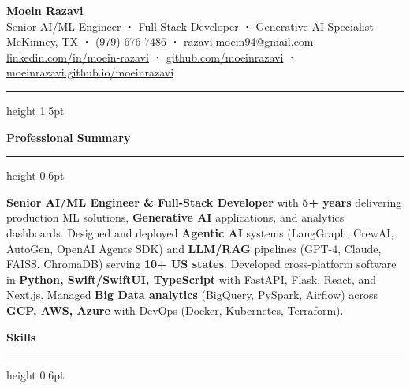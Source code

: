 \documentclass[11pt,letterpaper]{article}
\newcommand{\cvsection}[1]{%
  \vspace{0.2em}%
  {\color{headerblue}\large\bfseries #1}%
  \vspace{0.08em}%
  {\color{goldaccent}\hrule height 0.6pt}%
  \vspace{0.2em}%
}
\begin{document}
\begin{center}
  {\fontsize{20}{24}\selectfont\bfseries\color{headerblue}Moein Razavi}\\[0.2em]
  {\large\color{darktext}
    Senior AI/ML Engineer\enspace
    {\color{goldaccent}\textbf{·}}\enspace
    Full-Stack Developer\enspace
    {\color{goldaccent}\textbf{·}}\enspace
    Generative AI Specialist
  }\\[0.3em]
  {\color{graytext}
    McKinney, TX\enspace
    {\color{goldaccent}\textbf{·}}\enspace
    (979) 676-7486\enspace
    {\color{goldaccent}\textbf{·}}\enspace
    \href{mailto:razavi.moein94@gmail.com}{razavi.moein94@gmail.com}
  }\\[0.15em]
  {\color{graytext}
    \href{https://linkedin.com/in/moein-razavi}{linkedin.com/in/moein-razavi}\enspace
    {\color{goldaccent}\textbf{·}}\enspace
    \href{https://github.com/moeinrazavi}{github.com/moeinrazavi}\enspace
    {\color{goldaccent}\textbf{·}}\enspace
    {\color{accentcolor}\href{https://moeinrazavi.github.io/moeinrazavi/}{moeinrazavi.github.io/moeinrazavi}}
  }
\end{center}

\vspace{0.15em}
{\color{goldaccent}\hrule height 1.5pt}
\vspace{0.25em}

\cvsection{Professional Summary}

{\color{darktext}
\textbf{Senior AI/ML Engineer \& Full-Stack Developer} with \textbf{5+ years} delivering production ML solutions, \textbf{Generative AI} applications, and analytics dashboards. Designed and deployed \textbf{Agentic AI} systems (LangGraph, CrewAI, AutoGen, OpenAI Agents SDK) and \textbf{LLM/RAG} pipelines (GPT-4, Claude, FAISS, ChromaDB) serving \textbf{10+ US states}. Developed cross-platform software in \textbf{Python, Swift/SwiftUI, TypeScript} with FastAPI, Flask, React, and Next.js. Managed \textbf{Big Data analytics} (BigQuery, PySpark, Airflow) across \textbf{GCP, AWS, Azure} with DevOps (Docker, Kubernetes, Terraform).
}

\cvsection{Skills}
\end{document}
